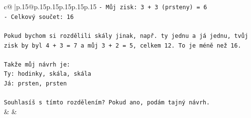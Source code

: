 \documentclass{article}
\begin{document}
{\begin{supertabular}{c@{$\;$}|p{.15\linewidth}@{}p{.15\linewidth}p{.15\linewidth}p{.15\linewidth}p{.15\linewidth}p{.15\linewidth}}
{{{\texttt{{-} Můj zisk: 3 + 3 (prsteny) = 6} \\
\texttt{{-} Celkový součet: 16} \\
\\ 
\texttt{Pokud bychom si rozdělili skály jinak, např. ty jednu a já jednu, tvůj zisk by byl 4 + 3 = 7 a můj 3 + 2 = 5, celkem 12. To je méně než 16.} \\
\\ 
\texttt{Takže můj návrh je:} \\
\texttt{Ty: hodinky, skála, skála} \\
\texttt{Já: prsten, prsten} \\
\\ 
\texttt{Souhlasíš s tímto rozdělením? Pokud ano, podám tajný návrh.} \\
            }
        }
    }
    & & \\ \\


\end{supertabular}}
\end{document}
